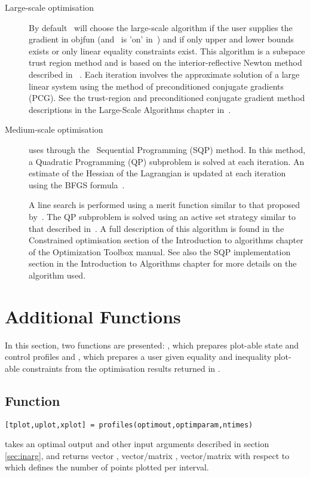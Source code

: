 \begin{description}
\item[Large-scale optimisation] 
By default~ will choose the large-scale algorithm if the
user supplies the gradient in objfun (and~ is 'on'
in~) and if only upper and lower bounds exists or only
linear equality constraints exist. This algorithm is a subspace trust
region method and is based on the interior-reflective Newton method
described in ~\cite{col96}. Each iteration involves the approximate
solution of a large linear system using the method of preconditioned
conjugate gradients (PCG). See the trust-region and preconditioned
conjugate gradient method descriptions in the Large-Scale Algorithms
chapter in~\cite{col99}. 
\item[Medium-scale optimisation]
 uses through the~ Sequential Programming
(SQP) method. In this method, a Quadratic Programming (QP) 
subproblem is solved at each iteration. An estimate of the Hessian of
the Lagrangian is updated at each iteration using the BFGS
formula~\cite{col96}.  

A line search is performed using a merit function similar to that
proposed by~\cite{han77}. The QP subproblem is solved using an 
active set strategy similar to that described in~\cite{gil81}. A full
description of this algorithm is found in the Constrained optimisation
section of the Introduction to algorithms chapter of the Optimization
Toolbox manual. See also the SQP implementation section in the
Introduction to Algorithms chapter for more details on the algorithm
used. 
\end{description}

\section{Additional Functions}
\label{sec:addfun}

In this section, two functions are presented: , which
prepares plot-able state and control profiles and ,
which prepares a user given equality and inequality plot-able
constraints from the optimisation results returned in
.

\subsection{Function~}
\label{sec:profiles}

\begin{verbatim}
[tplot,uplot,xplot] = profiles(optimout,optimparam,ntimes)
\end{verbatim}
takes an optimal output  and other input arguments
 described in section \ref{sec:inarg}, and returns
vector , vector/matrix , vector/matrix
 with respect to  which defines the
number of points plotted per interval.

